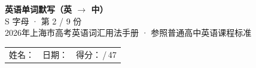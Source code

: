 \documentclass[10pt,a4paper]{article}
\begin{document}
\pagestyle{plain}

\begin{center}
{\LARGE\bfseries 英语单词默写（英 $\to$ 中）}\\[0.22em]
{\large S 字母 · 第 2 / 9 份}\\[0.18em]
{\small 2026年上海市高考英语词汇用法手册 · 参照普通高中英语课程标准}
\end{center}

\vspace{0.25em}
\noindent\begin{tabular}{@{}p{}@{}p{}@{}p{}@{}}
姓名：\underline{\hspace{2.0cm}} & 日期：\underline{\hspace{2.0cm}} & 得分：\underline{\hspace{1.3cm}}\,/\,47 \\
\end{tabular}

\vspace{0.3em}

\vspace{0.08em}
\end{document}
